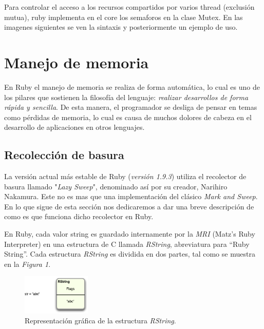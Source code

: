 \documentclass{article}
\begin{document}
Para controlar el acceso a los recursos compartidos por varios thread (exclusión mutua), ruby implementa en el core los semaforos en la clase Mutex. En las imagenes siguientes se ven la sintaxis y posteriormente un ejemplo de uso.

 
\bigskip

 
\bigskip




\section{Manejo de memoria}

	En Ruby el manejo de memoria se realiza de forma automática, lo cual es uno de los pilares que sostienen la filosofía del lenguaje: \textit{realizar desarrollos de forma rápida y sencilla}. De esta manera, el programador se desliga de pensar en temas como pérdidas de memoria, lo cual es causa de muchos dolores de cabeza en el desarrollo de aplicaciones en otros lenguajes.
\bigskip



\subsection{Recolección de basura}

	La versión actual más estable de Ruby (\textit{versión 1.9.3}) utiliza el recolector de basura llamado "\textit{Lazy Sweep}", denominado así por su creador, Narihiro Nakamura. Este no es mas que una implementación del clásico \textit{Mark and Sweep}. En lo que sigue de esta sección nos dedicaremos a dar una breve descripción de como es que funciona dicho recolector en Ruby.
	\par
	En Ruby, cada valor string es guardado internamente por la \textit{MRI} (Matz's Ruby Interpreter) en una estructura de C llamada \textit{RString}, abreviatura para ``Ruby String''. Cada estructura \textit{RString} es dividida en dos partes, tal como se muestra en la \textit{Figura 1}.
\bigskip

\begin{figure}[h]
	\centering
	\includegraphics[width=0.29\textwidth]{images/gc/gc01-rstring.png}
	\caption{Representación gráfica de la estructura \textit{RString}.}
\end{figure}
\bigskip
\end{document}

